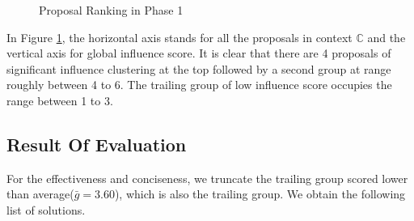 \begin{figure}[ht]
\centering
\caption{Proposal Ranking in Phase 1}
\label{fig:rankingp1}
\end{figure}

In Figure \ref{fig:rankingp1}, the horizontal axis stands for all the proposals in context $\mathbb{C}$ and the vertical axis for global influence score. It is clear that there are 4 proposals of significant influence clustering at the top followed by a second group at range roughly between 4 to 6. The trailing group of low influence score occupies the range between 1 to 3.

\subsection{Result Of Evaluation}
For the effectiveness and conciseness, we truncate the trailing group scored lower than average($\bar{g}=3.60$), which is also the trailing group. We obtain the following list of solutions.

\begin{table}[ht]
\caption{Solution List Of Phase 1}
\begin{adjustbox}{width=1\textwidth}
\end{adjustbox}
\label{tab:solution}
\end{table}

